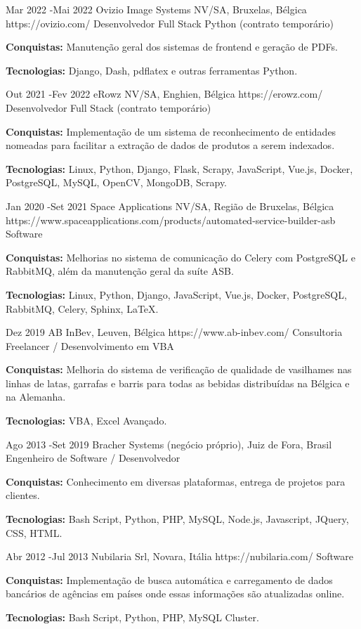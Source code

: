 \documentclass[10pt]{article} %
\begin{document}
\job
{Mar 2022 -}{Mai 2022}
{Ovizio Image Systems NV/SA, Bruxelas, Bélgica}
{https://ovizio.com/}
{Desenvolvedor Full Stack Python (contrato temporário)}
{\rule{0mm}{2mm}\textbf{Conquistas:} Manutenção geral dos sistemas de frontend e geração de PDFs.\\
\rule{0mm}{3mm}\textbf{Tecnologias:} Django, Dash, pdflatex e outras ferramentas Python.}


\job
{Out 2021 -}{Fev 2022}
{eRowz NV/SA, Enghien, Bélgica}
{https://erowz.com/}
{Desenvolvedor Full Stack (contrato temporário)}
{\rule{0mm}{2mm}\textbf{Conquistas:} Implementação de um sistema de reconhecimento de entidades nomeadas para facilitar a extração de dados de produtos a serem indexados.\\
\rule{0mm}{3mm}\textbf{Tecnologias:} Linux, Python, Django, Flask, Scrapy, JavaScript, Vue.js, Docker, PostgreSQL, MySQL, OpenCV, MongoDB, Scrapy.}


\job
{Jan 2020 -}{Set 2021}
{Space Applications NV/SA, Região de Bruxelas, Bélgica}
{https://www.spaceapplications.com/products/automated-service-builder-asb}
{Software}
{\rule{0mm}{2mm}\textbf{Conquistas:} Melhorias no sistema de comunicação do Celery com PostgreSQL e RabbitMQ, além da manutenção geral da suíte ASB.\\
\rule{0mm}{3mm}\textbf{Tecnologias:} Linux, Python, Django, JavaScript, Vue.js, Docker, PostgreSQL, RabbitMQ, Celery, Sphinx, LaTeX.}


\job
{Dez 2019}{}
{AB InBev, Leuven, Bélgica}
{https://www.ab-inbev.com/}
{Consultoria Freelancer / Desenvolvimento em VBA}
{\rule{0mm}{2mm}\textbf{Conquistas:} Melhoria do sistema de verificação de qualidade de vasilhames nas linhas de latas, garrafas e barris para todas as bebidas distribuídas na Bélgica e na Alemanha.\\
\rule{0mm}{3mm}\textbf{Tecnologias:} VBA, Excel Avançado.}


\job
{Ago 2013 -}{Set 2019}
{Bracher Systems (negócio próprio), Juiz de Fora, Brasil}
{}
{Engenheiro de Software / Desenvolvedor}
{\rule{0mm}{2mm}\textbf{Conquistas:} Conhecimento em diversas plataformas, entrega de projetos para clientes.\\
\rule{0mm}{3mm}\textbf{Tecnologias:} Bash Script, Python, PHP, MySQL, Node.js, Javascript, JQuery, CSS, HTML.}


\job
{Abr 2012 -}{Jul 2013}
{Nubilaria Srl, Novara, Itália}
{https://nubilaria.com/}
{Software}
{\rule{0mm}{2mm}\textbf{Conquistas:} Implementação de busca automática e carregamento de dados bancários de agências em países onde essas informações são atualizadas online.\\
\rule{0mm}{3mm}\textbf{Tecnologias:} Bash Script, Python, PHP, MySQL Cluster.}
\end{document}
